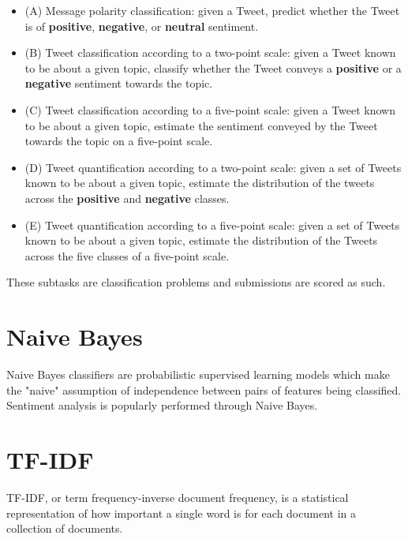 \documentclass[11pt, twoside, reqno]{book}
\begin{document}
\begin{itemize}
	\item (A) Message polarity classification: given a Tweet, predict whether the Tweet is of \textbf{positive}, \textbf{negative}, or \textbf{neutral} sentiment.

	\item (B) Tweet classification according to a two-point scale: given a Tweet known to be about a given topic, classify whether the Tweet conveys a \textbf{positive} or a \textbf{negative} sentiment towards the topic. 

	\item (C) Tweet classification according to a five-point scale: given a Tweet known to be about a given topic, estimate the sentiment conveyed by the Tweet towards the topic on a five-point scale.

	\item (D) Tweet quantification according to a two-point scale: given a set of Tweets known to be about a given topic, estimate the distribution of the tweets across the \textbf{positive} and \textbf{negative} classes.

	\item (E) Tweet quantification according to a five-point scale: given a set of Tweets known to be about a given topic, estimate the distribution of the Tweets across the five classes of a five-point scale.
\end{itemize}

These subtasks are classification problems and submissions are scored as such.

\section{Naive Bayes}

Naive Bayes classifiers are probabilistic supervised learning models which make the "naive" assumption of independence between pairs of features being classified. Sentiment analysis is popularly performed through Naive Bayes.

\label{secI4}

\section{TF-IDF}
\label{secI5}

TF-IDF, or term frequency-inverse document frequency, is a statistical representation of how important a single word is for each document in a collection of documents.
\end{document}
